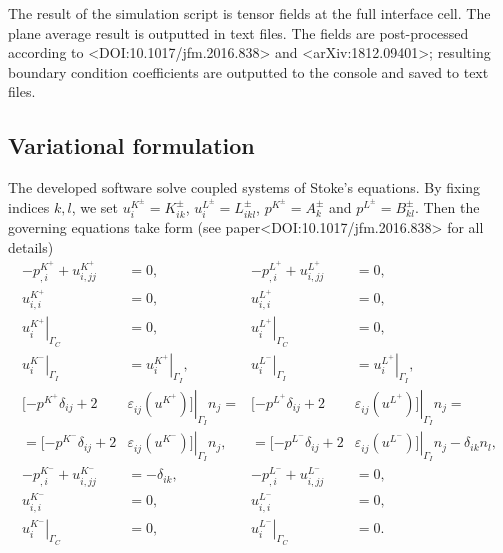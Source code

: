 \documentclass[12pt,a4paper]{article}
\newcommand{\str}[3]{\varepsilon^{#1}_{#2} \left( #3 \right)}
\begin{document}
The result of the simulation script is tensor fields at the full interface cell. The plane average result is
outputted in text files. The fields are post-processed according to <DOI:10.1017/jfm.2016.838>
and <arXiv:1812.09401>; resulting boundary condition coefficients are outputted to the console and
saved to text files.

\newpage
\subsection{Variational formulation}

The developed software solve coupled systems of Stoke's equations. By fixing indices $k,l$, we set $u_i^{K^{\pm}} = K^{\pm}_{ik}$, $u_i^{L^{\pm}} = L^{\pm}_{ikl}$, $p^{K^{\pm}} = A^{\pm}_{k}$ and $p^{L^{\pm}} = B^{\pm}_{kl}$. Then the governing equations take form (see paper<DOI:10.1017/jfm.2016.838> for all details)
\begin{align}
- p^{K^{+}}_{,i} + u^{K^{+}}_{i,jj} & = 0, &  - p^{L^{+}}_{,i} + u^{L^{+}}_{i,jj} & = 0, \\
u^{K^{+}}_{i,i} & = 0, & u^{L^{+}}_{i,i} & = 0 , \\
\left. u^{K^{+}}_{i} \right|_{\Gamma_C} & = 0, & \left. u^{L^{+}}_{i} \right|_{\Gamma_C} & = 0, \\
\left. u^{K^{-}}_{i} \right|_{\Gamma_I} & = \left. u^{K^{+}}_{i} \right|_{\Gamma_I}, &  \left. u^{L^{-}}_{i} \right|_{\Gamma_I} & = \left. u^{L^{+}}_{i} \right|_{\Gamma_I},  \\
[ - p^{K^{+}} \delta_{ij} + 2 & \left. \str{}{ij}{u^{K^{+}}} ] \right|_{\Gamma_I} n_j = &  [ - p^{L^{+}} \delta_{ij} + 2 & \left. \str{}{ij}{u^{L^{+}}} ] \right|_{\Gamma_I} n_j = \\
= [ - p^{K^{-}} \delta_{ij} + 2 & \left. \str{}{ij}{u^{K^{-}}} ] \right|_{\Gamma_I} n_j,  &  = [ - p^{L^{-}} \delta_{ij} + 2 & \left. \str{}{ij}{u^{L^{-}}} ] \right|_{\Gamma_I} n_j - \delta_{ik} n_l,  \\
- p^{K^{-}}_{,i} + u^{K^{-}}_{i,jj} & = - \delta_{ik},  & - p^{L^{-}}_{,i} + u^{L^{-}}_{i,jj} & = 0,  \\
u^{K^{-}}_{i,i} & = 0, & u^{L^{-}}_{i,i} & = 0, \\
\left. u^{K^{-}}_{i} \right|_{\Gamma_C} & = 0, & \left. u^{L^{-}}_{i} \right|_{\Gamma_C} & = 0.
\end{align}
\end{document}
